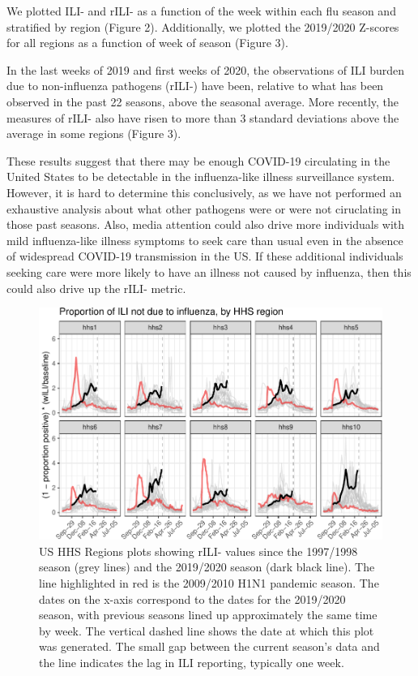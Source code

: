 \documentclass[]{article}
\begin{document}
We plotted ILI- and rILI- as a function of the week within each flu
season and stratified by region (Figure 2). Additionally, we plotted the
2019/2020 Z-scores for all regions as a function of week of season
(Figure 3).

In the last weeks of 2019 and first weeks of 2020, the observations of
ILI burden due to non-influenza pathogens (rILI-) have been, relative to
what has been observed in the past 22 seasons, above the seasonal
average. More recently, the measures of rILI- also have risen to more
than 3 standard deviations above the average in some regions (Figure 3).

These results suggest that there may be enough COVID-19 circulating in
the United States to be detectable in the influenza-like illness
surveillance system. However, it is hard to determine this conclusively,
as we have not performed an exhaustive analysis about what other
pathogens were or were not ciruclating in those past seasons. Also,
media attention could also drive more individuals with mild
influenza-like illness symptoms to seek care than usual even in the
absence of widespread COVID-19 transmission in the US. If these
additional individuals seeking care were more likely to have an illness
not caused by influenza, then this could also drive up the rILI- metric.

\begin{figure}
\centering
\includegraphics{ili-labtest-report_files/figure-latex/all-region-plot-ILI-1.pdf}
\caption{\label{fig:all-region-plot}US HHS Regions plots showing rILI-
values since the 1997/1998 season (grey lines) and the 2019/2020 season
(dark black line). The line highlighted in red is the 2009/2010 H1N1
pandemic season. The dates on the x-axis correspond to the dates for the
2019/2020 season, with previous seasons lined up approximately the same
time by week. The vertical dashed line shows the date at which this plot
was generated. The small gap between the current season's data and the
line indicates the lag in ILI reporting, typically one week.}
\end{figure}
\end{document}
